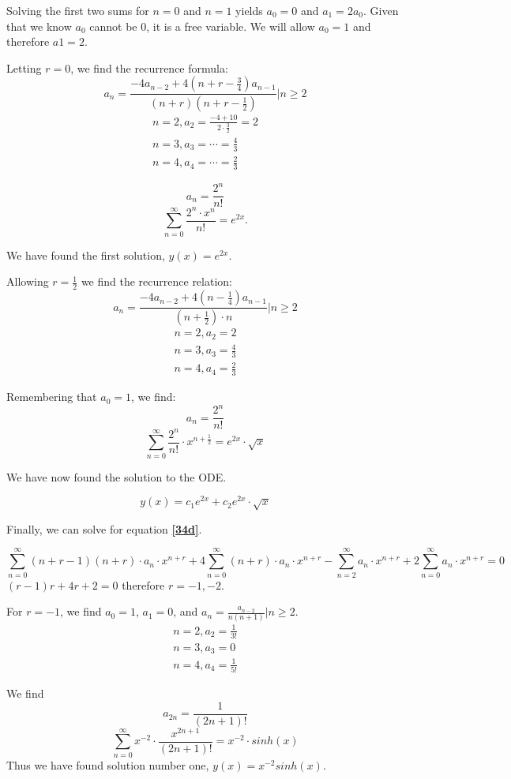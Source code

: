 \documentclass{article}
\begin{document}
Solving the first two sums for $n=0$ and $n=1$ yields $a_0=0$ and $a_1=2a_0$. Given that we know $a_0$ cannot be 0, it is a free variable. We will allow $a_0 = 1$ and therefore $a1 = 2$.

Letting $r = 0$, we find the recurrence formula:
$$a_n = \frac{-4a_{n-2}+4(n+r-\frac{3}{4})a_{n-1}}{(n+r)(n+r-\frac{1}{2})} \Bigr| n \geq 2$$
\begin{align*}
n=2, a_2 = \frac{ -4 + 10}{2 \cdot \frac{3}{2}} = 2\\
n=3, a_3 = \cdots = \frac{4}{3}\\
n=4, a_4 = \cdots = \frac{2}{3}
\end{align*}

$$a_n = \frac{2^n}{n!}$$
$$\sum_{n=0}^{\infty} \frac{2^n \cdot x^n}{n!} = e^{2x}.$$

We have found the first solution, $y(x) = e^{2x}$.

Allowing $r=\frac{1}{2}$ we find the recurrence relation:
$$a_n = \frac{-4a_{n-2} + 4(n-\frac{1}{4})a_{n-1}}{(n+\frac{1}{2}) \cdot n} \Bigr| n \geq 2$$
\begin{align*}
n=2, a_2 = 2\\
n=3, a_3 = \frac{4}{3}\\
n=4, a_4 = \frac{2}{3}
\end{align*}

Remembering that $a_0 = 1$, we find:
$$a_n = \frac{2^n}{n!}$$
$$\sum_{n=0}^{\infty} \frac{2^n}{n!} \cdot x^{n+\frac{1}{2}} = e^{2x} \cdot \sqrt{x}$$

We have now found the solution to the ODE.

\[
y(x) = c_1 e^{2x} + c_2 e^{2x} \cdot \sqrt{x}
\]

\par
Finally, we can solve for equation \textbf{\ref{34d}}.

\[
\sum_{n=0}^{\infty} (n+r-1)(n+r) \cdot a_n \cdot x^{n+r} + 4\sum_{n=0}^{\infty} (n+r) \cdot a_n \cdot x^{n+r} - \sum_{n=2}^{\infty} a_n \cdot x^{n+r} + 2 \sum_{n=0}^{\infty} a_n \cdot x^{n+r} = 0
\]
$(r-1)r+4r+2=0$ therefore $r = -1, -2$.

For $r = -1$, we find $a_0 = 1$, $a_1 = 0$, and $a_n = \frac{a_{n-2}}{n(n+1)} \Bigr | n \geq 2$.
\begin{align*}
n=2, a_2 = \frac{1}{3!}\\
n=3, a_3 = 0\\
n=4, a_4 = \frac{1}{5!}
\end{align*}

We find
$$a_{2n} = \frac{1}{(2n+1)!}$$
$$\sum_{n=0}^{\infty} x^{-2} \cdot \frac{x^{2n+1}}{(2n+1)!} = x^{-2} \cdot sinh(x) $$
Thus we have found solution number one, $y(x) = x^{-2} sinh(x)$.
\end{document}

